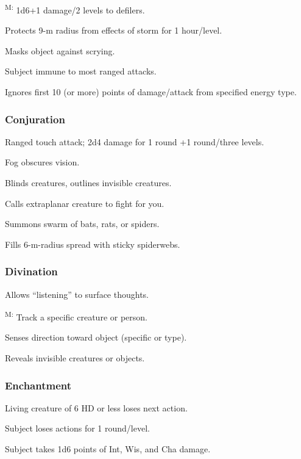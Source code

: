 	\textsuperscript{M:} 1d6+1 damage/2 levels to defilers. %

	 Protects 9-m radius from effects of storm for 1 hour/level.%

	 Masks object against scrying.

	 Subject immune to most ranged attacks.

	 Ignores first 10 (or more) points of damage/attack from specified energy type.

\subsubsection{Conjuration}
	 Ranged touch attack; 2d4 damage for 1 round +1 round/three levels.

	 Fog obscures vision.

	 Blinds creatures, outlines invisible creatures.

	 Calls extraplanar creature to fight for you.

	 Summons swarm of bats, rats, or spiders.

	 Fills 6-m-radius spread with sticky spiderwebs.

\subsubsection{Divination}
	 Allows ``listening'' to surface thoughts.

	\textsuperscript{M:} Track a specific creature or person. %

	 Senses direction toward object (specific or type).

	 Reveals invisible creatures or objects.

\subsubsection{Enchantment}
	 Living creature of 6 HD or less loses next action.

	 Subject loses actions for 1 round/level.

	 Subject takes 1d6 points of Int, Wis, and Cha damage.

